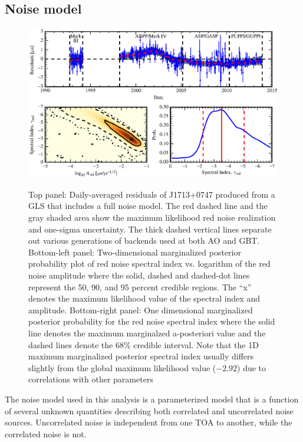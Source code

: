 \subsection{Noise model}
\label{sec:noise}

%
\begin{figure}[!ht]
\centering
\includegraphics[scale=1.0]{fig3.eps} \\ 
\caption{\label{fig:res} Top panel: Daily-averaged residuals of J1713+0747 produced from a GLS that includes a 
full noise model. The red dashed line and the gray shaded area show the maximum likelihood red noise
realization and one-sigma uncertainty. The thick dashed vertical lines separate out various generations
of backends used at both AO and GBT.
Bottom-left panel: Two-dimensional marginalized posterior probability plot of red
noise spectral index vs. logarithm of the red noise amplitude where the solid, dashed and
dashed-dot lines represent the 50, 90, and 95 percent credible regions. The ``x'' denotes
the maximum likelihood value of the spectral index and amplitude.
Bottom-right panel: One dimensional marginalized posterior probability for the
red noise spectral index where the solid line denotes the maximum marginalzed a-posteriori
value and the dashed lines denote the 68\% credible interval. Note that the
1D maximum marginalized posterior spectral index usually differs slightly from the
global maximum likelihood value ($-2.92$) due to correlations with other parameters}
\end{figure} 
%
The noise model used in this analysis is a parameterized model that is a function of several unknown quantities describing both correlated and uncorrelated noise sources. Uncorrelated noise is 
independent from one TOA to another, while the correlated noise is not. 
